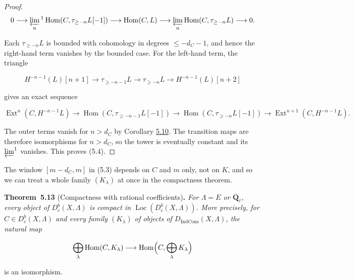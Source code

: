\documentclass[11pt]{article}
\newenvironment{bpstatement}[2]{\par\addvspace{0.6\baselineskip}\noindent\textbf{#1}#2\textbf{.}\enspace\ignorespaces}
  {\par\addvspace{0.4\baselineskip}}
\newenvironment{bpstatementit}[2]{\begin{bpstatement}{#1}{#2}\itshape\ignorespaces}{\end{bpstatement}}
\providecommand{\Dbc}{}\renewcommand{\Dbc}{D^b_c}
\providecommand{\Dic}{}\renewcommand{\Dic}{D_{\IndCons}}
\providecommand{\Ext}{}\renewcommand{\Ext}{\operatorname{Ext}}
\providecommand{\Hom}{}\renewcommand{\Hom}{\operatorname{Hom}}
\providecommand{\IndCons}{}\renewcommand{\IndCons}{\operatorname{IndCons}}
\providecommand{\Loc}{}\renewcommand{\Loc}{\operatorname{Loc}}
\begin{document}
\begin{proof}[{Proof}]
\[
0\longrightarrow\varprojlim_n{}^1
\Hom(C,\tau_{\geq-n}L[-1])
\longrightarrow\Hom(C,L)
\longrightarrow\varprojlim_n\Hom(C,\tau_{\geq-n}L)
\longrightarrow0.
\]

Each \(\tau_{\geq-n}L\) is bounded with cohomology in degrees \(\leq-d_C-1\), and hence the right-hand term vanishes by the bounded case. For the left-hand term, the triangle

\[
H^{-n-1}(L)[n+1]\longrightarrow \tau_{\geq-n-1}L
\longrightarrow \tau_{\geq-n}L\longrightarrow H^{-n-1}(L)[n+2]
\]

gives an exact sequence

\[
\Ext^{n}(C,H^{-n-1}L)\to\Hom(C,\tau_{\geq-n-1}L[-1])\to\Hom(C,\tau_{\geq-n}L[-1])
\to\Ext^{n+1}(C,H^{-n-1}L).
\]

The outer terms vanish for \(n>d_C\) by Corollary \hyperref[bp436]{5.10}. The transition maps are therefore isomorphisms for \(n>d_C\), so the tower is eventually constant and its \(\varprojlim^1\) vanishes. This proves (5.4).
\end{proof}

\label{bp445}%
The window \([m-d_C,m]\) in (5.3) depends on \(C\) and \(m\) only, not on \(K\), and so we can treat a whole family \((K_\lambda)\) at once in the compactness theorem.

\label{bp446}%
\begin{bpstatementit}{Theorem~5.13}{ (Compactness with rational coefficients)}
For \(\Lambda=E\) or \(\overline{\mathbf Q}_\ell\), every object of \(\Dbc(X,\Lambda)\) is compact in \(\Loc(\Dbc(X,\Lambda))\). More precisely, for \(C\in\Dbc(X,\Lambda)\) and every family \((K_\lambda)\) of objects of \(\Dic(X,\Lambda)\), the natural map

\[
\bigoplus_\lambda\Hom(C,K_\lambda)
\longrightarrow\Hom\Bigl(C,\bigoplus_\lambda K_\lambda\Bigr)
\]

is an isomorphism.
\end{bpstatementit}
\end{document}
